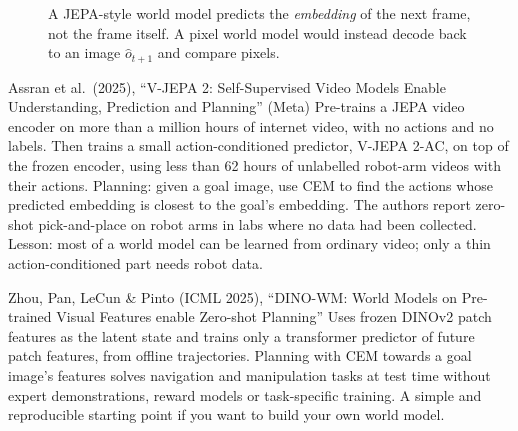 \begin{figure}[h]
\centering
{}
\caption{A JEPA-style world model predicts the \emph{embedding} of the next frame, not the frame itself. A pixel world model would instead decode back to an image $\hat o_{t+1}$ and compare pixels.}
\label{fig:jepa}
\end{figure}

\begin{paperbox}{Assran et al.\ (2025), ``V-JEPA 2: Self-Supervised Video Models Enable Understanding, Prediction and Planning'' (Meta)}
Pre-trains a JEPA video encoder on more than a million hours of internet video, with no actions and no labels. Then trains a small action-conditioned predictor, V-JEPA 2-AC, on top of the frozen encoder, using less than 62 hours of unlabelled robot-arm videos with their actions. Planning: given a goal image, use CEM to find the actions whose predicted embedding is closest to the goal's embedding. The authors report zero-shot pick-and-place on robot arms in labs where no data had been collected. Lesson: most of a world model can be learned from ordinary video; only a thin action-conditioned part needs robot data.
\end{paperbox}

\begin{paperbox}{Zhou, Pan, LeCun \& Pinto (ICML 2025), ``DINO-WM: World Models on Pre-trained Visual Features enable Zero-shot Planning''}
Uses frozen DINOv2 patch features as the latent state and trains only a transformer predictor of future patch features, from offline trajectories. Planning with CEM towards a goal image's features solves navigation and manipulation tasks at test time without expert demonstrations, reward models or task-specific training. A simple and reproducible starting point if you want to build your own world model.
\end{paperbox}

